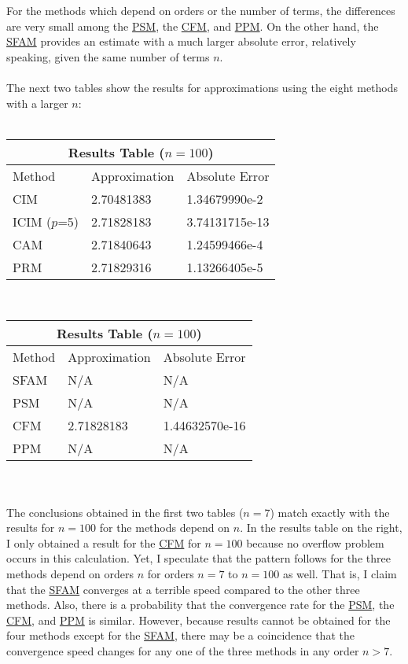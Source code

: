 \documentclass[11pt]{article}
\begin{document}
For the methods which depend on orders or the number of terms, the differences are very small among the \hyperref[2.6]{PSM}, the \hyperref[2.7]{CFM}, and \hyperref[2.8]{PPM}. On the other hand, the \hyperref[2.5]{SFAM} provides an estimate with a much larger absolute error, relatively speaking, given the same number of terms $n$.
\\\\
The next two tables show the results for approximations using the eight methods with a larger $n$:\\\\
\begin{tabular}{ |p{1.95cm}|p{2.35cm}|p{2.78cm}| }
\hline
\multicolumn{3}{|c|}{Results Table ($n=100$)} \\
\hline
Method       & Approximation & Absolute Error \\ 
\hline\hline
CIM          & 2.70481383    & 1.34679990e-2 \\ 
\hline
ICIM ($p$=5) & 2.71828183    & 3.74131715e-13 \\
\hline
CAM          & 2.71840643    & 1.24599466e-4 \\
\hline
PRM          & 2.71829316    & 1.13266405e-5 \\
\hline
\end{tabular}
\,
\begin{tabular}{ |p{1.2cm}|p{2.35cm}|p{2.78cm}| }
\hline
\multicolumn{3}{|c|}{Results Table ($n=100$)} \\
\hline
Method & Approximation & Absolute Error \\ 
\hline\hline
SFAM   & N/A           & N/A \\
\hline
PSM    & N/A           & N/A \\
\hline
CFM    & 2.71828183    & 1.44632570e-16 \\
\hline
PPM    & N/A           & N/A \\
\hline
\end{tabular}
\\\\
The conclusions obtained in the first two tables ($n=7$) match exactly 
with the results for $n=100$ for the methods depend on $n$. In the results table on the right, I only obtained a result for the \hyperref[2.7]{CFM} for $n=100$ because no overflow problem occurs in this calculation. Yet, I speculate that the pattern follows for the three methods depend on orders $n$ for orders $n=7$ to $n=100$ as well. That is, I claim that the \hyperref[2.5]{SFAM} converges at a terrible speed compared to the other three methods. Also, there is a probability that the convergence rate for the \hyperref[2.6]{PSM}, the \hyperref[2.7]{CFM}, and \hyperref[2.8]{PPM} is similar. However, because results cannot be obtained for the four methods except for the \hyperref[2.5]{SFAM}, there may be a coincidence that the convergence speed changes for any one of the three methods in any order $n>7$.
\end{document}
